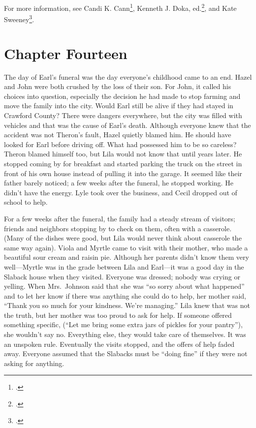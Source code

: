 \documentclass[
  letterpaper,
]{book}
\begin{document}
For more information, see Candi K. Cann\footnote{.}, Kenneth J. Doka,
ed.\footnote{.}, and
Kate Sweeney\footnote{.}.


\chapter{Chapter Fourteen}\label{chapter-fourteen}

The day of Earl's funeral was the day everyone's childhood came to an
end. Hazel and John were both crushed by the loss of their son. For
John, it called his choices into question, especially the decision he
had made to stop farming and move the family into the city. Would Earl
still be alive if they had stayed in Crawford County? There were dangers
everywhere, but the city was filled with vehicles and that was the cause
of Earl's death. Although everyone knew that the accident was not
Theron's fault, Hazel quietly blamed him. He should have looked for Earl
before driving off. What had possessed him to be so careless? Theron
blamed himself too, but Lila would not know that until years later. He
stopped coming by for breakfast and started parking the truck on the
street in front of his own house instead of pulling it into the garage.
It seemed like their father barely noticed; a few weeks after the
funeral, he stopped working. He didn't have the energy. Lyle took over
the business, and Cecil dropped out of school to help.

For a few weeks after the funeral, the family had a steady stream of
visitors; friends and neighbors stopping by to check on them, often with
a casserole. (Many of the dishes were good, but Lila would never think
about casserole the same way again). Viola and Myrtle came to visit with
their mother, who made a beautiful sour cream and raisin pie. Although
her parents didn't know them very well---Myrtle was in the grade between
Lila and Earl---it was a good day in the Slaback house when they
visited. Everyone was dressed; nobody was crying or yelling. When
Mrs.~Johnson said that she was ``so sorry about what happened'' and to
let her know if there was anything she could do to help, her mother
said, ``Thank you so much for your kindness. We're managing.'' Lila knew
that was not the truth, but her mother was too proud to ask for help. If
someone offered something specific, (``Let me bring some extra jars of
pickles for your pantry''), she wouldn't say no. Everything else, they
would take care of themselves. It was an unspoken rule. Eventually the
visits stopped, and the offers of help faded away. Everyone assumed that
the Slabacks must be ``doing fine'' if they were not asking for
anything.
\end{document}
